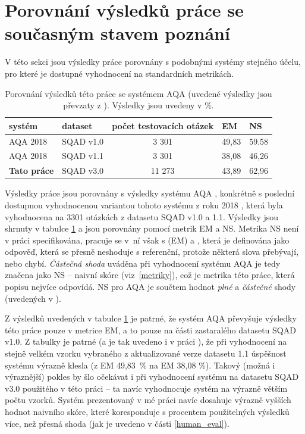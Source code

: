 \section*{Porovnání výsledků práce se současným stavem poznání}
V této sekci jsou výsledky práce porovnány s podobnými systémy stejného účelu, pro které je dostupné vyhodnocení na standardních metrikách.\par
\begin{table}[H]
\centering
\begin{tabular}{|l|l|c||l|l|}
\hline
systém     & dataset   & počet testovacích otázek & \textbf{EM} & \textbf{NS} \\ \hline \hline
AQA 2018   & SQAD v1.0 & 3 301                    & 49,83       & 59.58       \\ \hline
AQA 2018   & SQAD v1.1 & 3 301                    & 38,08       & 46,26       \\ \hline
\textbf{Tato práce} & SQAD v3.0 & 11 273                   & 43,89       & 62,96       \\ \hline
\end{tabular}
\caption{Porovnání výsledků této práce se systémem AQA \cite{aqa} (uvedené výsledky jsou převzaty z \cite{aqa2018}). Výsledky jsou uvedeny v \%.}
\label{tab:aqa_compare}
\end{table}
Výsledky práce jsou porovnány s výsledky systému AQA \cite{aqa}, konkrétně s poslední dostupnou vyhodnocenou variantou tohoto systému z roku 2018 \cite{aqa2018}, která byla vyhodnocena na 3301 otázkách z datasetu SQAD v1.0 a 1.1. Výsledky jsou shrnuty v tabulce \ref{tab:aqa_compare} a jsou porovnány pomocí metrik EM a NS. Metrika NS není v práci specifikována, pracuje se v~ní však s  (EM) a , která je definována jako odpověď, která se přesně neshoduje s referenční, protože některá slova přebývají, nebo chybí. \emph{Částečná shoda} uváděna při vyhodnocení systému AQA je tedy značena jako NS -- naivní skóre (viz~\ref{metriky}), což je metrika této práce, která popisu nejvíce odpovídá. NS pro AQA je součtem hodnot \emph{plné} a \emph{částečné} shody (uvedených v \cite{aqa2018}).\par
Z výsledků uvedených v tabulce \ref{tab:aqa_compare} je patrné, že systém AQA převyšuje výsledky této práce pouze v metrice EM, a to pouze na části zastaralého datasetu SQAD v1.0. Z tabulky je patrné (a je tak uvedeno i v práci \cite{aqa2018}), že při vyhodnocení na stejně velkém vzorku vybraného z aktualizované verze datasetu 1.1 úspěšnost systému výrazně klesla (z EM 49,83~\% na EM 38,08 \%). Takový (možná i výraznější) pokles by šlo očekávat i při vyhodnocení systému na datasetu SQAD v3.0 použitého v této práci -- ta navíc vyhodnocuje systém na výrazně větším počtu vzorků. Systém prezentovaný v mé práci navíc dosahuje výrazně vyšších hodnot naivního skóre, které koresponduje s procentem použitelných výsledků více, než přesná shoda (jak je uvedeno v části \ref{human_eval}).\par
